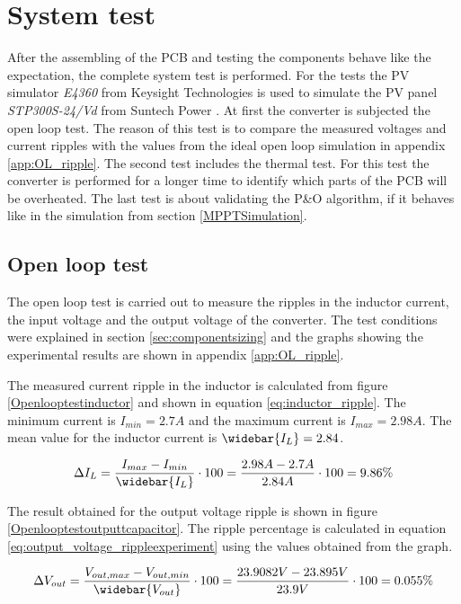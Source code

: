 \section{System test}
After the assembling of the PCB and testing the components behave like the expectation, the complete system test is performed. For the tests the PV simulator \textit{E4360} from Keysight Technologies \cite{PV_simulator} is used to simulate the PV panel \textit{STP300S-24/Vd} from Suntech Power \cite{PV_panel}. At first the converter is subjected the open loop test. The reason of this test is to compare the measured voltages and current ripples with the values from the ideal open loop simulation in appendix \ref{app:OL_ripple}. The second test includes the thermal test. For this test the converter is performed for a longer time to identify which parts of the PCB will be overheated. The last test is about validating the P\&O algorithm, if it behaves like in the simulation from section \ref{MPPTSimulation}.

\subsection{Open loop test}

The open loop test is carried out to measure the ripples in the inductor current, the input voltage and the output voltage of the converter. The test conditions were explained in section \ref{sec:componentsizing} and the graphs showing the experimental results are shown in appendix \ref{app:OL_ripple}.

The measured current ripple in the inductor is calculated from figure \ref{Openlooptestinductor} and shown in equation \ref{eq:inductor_ripple}. The minimum current is $I_{min} = 2.7A$ and the maximum current is $I_{max} = 2.98A$. The mean value for the inductor current is $\widebar{I_L}= 2.84$. 

\begin{equation} \label{eq:inductor_rippleexpirment}
\Delta I_L = \frac{I_{max}-I_{min}}{\widebar{I_L}} \cdot 100 = \frac{2.98A-2.7A}{2.84A} \cdot 100 = 9.86\%
\end{equation}

The result obtained for the output voltage ripple is shown in figure \ref{Openlooptestoutputtcapacitor}. The ripple percentage is calculated in equation \ref{eq:output_voltage_rippleexperiment} using the values obtained from the graph. 

\begin{equation} \label{eq:output_voltage_rippleexperiment}
\Delta V_{out} = \frac{V_{out,max}-V_{out,min}}{\widebar{V_{out}}} \cdot 100 = \frac{23.9082V - 23.895V }{23.9V} \cdot 100 = 0.055\%
\end{equation}

